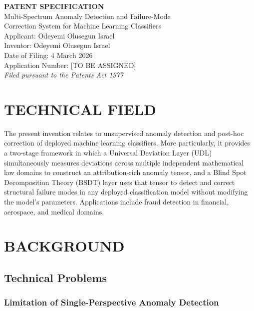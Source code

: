 \documentclass[12pt,a4paper]{article}
\begin{document}
\begin{center}
{\LARGE\bfseries PATENT SPECIFICATION}\\[1em]
{\Large Multi-Spectrum Anomaly Detection and Failure-Mode\\
Correction System for Machine Learning Classifiers}\\[2em]
{\large Applicant: Odeyemi Olusegun Israel}\\[0.5em]
{\large Inventor: Odeyemi Olusegun Israel}\\[0.5em]
{\large Date of Filing: 4 March 2026}\\[0.5em]
{\large Application Number: [TO BE ASSIGNED]}\\[0.3em]
{\normalsize \textit{Filed pursuant to the Patents Act 1977}}
\end{center}

\vspace{2em}

\section{TECHNICAL FIELD}

The present invention relates to unsupervised anomaly detection and
post-hoc correction of deployed machine learning classifiers. More
particularly, it provides a two-stage framework in which a Universal
Deviation Layer (UDL) simultaneously measures deviations across multiple
independent mathematical law domains to construct an attribution-rich
anomaly tensor, and a Blind Spot Decomposition Theory (BSDT) layer uses
that tensor to detect and correct structural failure modes in any deployed
classification model without modifying the model's parameters. Applications
include fraud detection in financial, aerospace, and medical domains.

\section{BACKGROUND}

\subsection{Technical Problems}

\subsubsection{Limitation of Single-Perspective Anomaly Detection}
\end{document}
